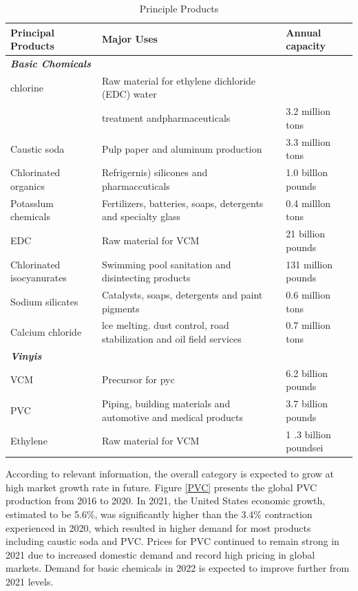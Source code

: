 \documentclass[
	a4paper, %
	12pt,%
]{CSSullivanBusinessReport}
\begin{document}
\begin{fullwidth}
\begin{table}[!ht]\footnotesize
    \centering
    \caption{Principle Products}
    \label{PrincipleProducts}
    \begin{tabular}{lll}
    \hline
        Principal Products & Major Uses & Annual capacity  \\ \hline
        \textit{\textbf{\color{Blue}Basic Chomicals}} & ~ &   \\ 
        chlorine & Raw material for ethylene dichloride (EDC) water \\ & treatment andpharmaceuticals & 3.2 million tons  \\ 
        Caustic soda & Pulp paper and aluminum production & 3.3 million tons  \\ 
        Chlorinated organics & Refrigernis) silicones and pharmaccuticals & 1.0 billlon pounds  \\ 
        Potasslum chemicals & Fertilizers, batteries, soaps, detergents and specialty glass & 0.4 milllon tons  \\ 
        EDC & Raw material for VCM & 21 billion pounds  \\ 
        Chlorinated isocyanurates & Swimming pool sanitation and disintecting products & 131 million pounds  \\ 
        Sodium silicates & Catalysts, soaps, detergents and paint pigments & 0.6 million tons  \\ 
        Calcium chloride & lce melting. dust control, road stabilization and oil field services & 0.7 million tons  \\ 
        \textit{\textbf{\color{blue}Vinyis}} & ~ &   \\ 
        VCM & Precursor for pyc & 6.2 billion pounds  \\ 
        PVC & Piping, building materials and automotive and medical products & 3.7 billion pounds  \\ 
        Ethylene & Raw material for VCM & 1 .3 billion poundsei  \\ \hline
    \end{tabular}
\end{table}
According to relevant information, the overall category is expected to grow at high market growth rate in future. Figure \ref{PVC} presents the global PVC production from 2016 to 2020. In 2021, the United States economic growth, estimated to be 5.6\%, was significantly higher than the 3.4\% contraction experienced in 2020, which resulted in higher demand for most products including caustic soda and PVC. Prices for PVC continued to remain strong in 2021 due to increased domestic demand and record high pricing in global markets. Demand for basic chemicals in 2022 is expected to improve further from 2021 levels.

\end{fullwidth}
\end{document}
